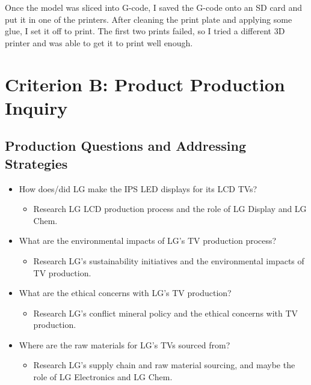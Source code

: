 \documentclass[12pt, letterpaper]{article}
\makeatletter
\newcommand\todo[1]{{\color{red}{\footnotesize[TODO:\@ #1]}}}
\makeatother
\begin{document}
Once the model was sliced into G-code, I saved the G-code onto an SD
card and put it in one of the printers. After cleaning the print
plate and applying some glue, I set it off to print. The first two
prints failed, so I tried a different 3D printer and was able to get
it to print well enough.

\todo{Image of the printed 3D model.}

\section{Criterion B: Product Production Inquiry}

\subsection{Production Questions and Addressing Strategies}

\begin{itemize}
  \item How does/did LG make the IPS LED displays for its LCD TVs?
    \begin{itemize}
      \item Research LG LCD production process and the role of LG
        Display and LG Chem.
    \end{itemize}

  \item What are the environmental impacts of LG's TV production
    process?
    \begin{itemize}
      \item Research LG's sustainability initiatives and the
        environmental impacts of TV production.
    \end{itemize}

  \item What are the ethical concerns with LG's TV production?
    \begin{itemize}
      \item Research LG's conflict mineral policy and the ethical
        concerns with TV production.
    \end{itemize}

  \item Where are the raw materials for LG's TVs sourced from?
    \begin{itemize}
      \item Research LG's supply chain and raw material sourcing, and
        maybe the role of LG Electronics and LG Chem.
    \end{itemize}
\end{itemize}
\end{document}
